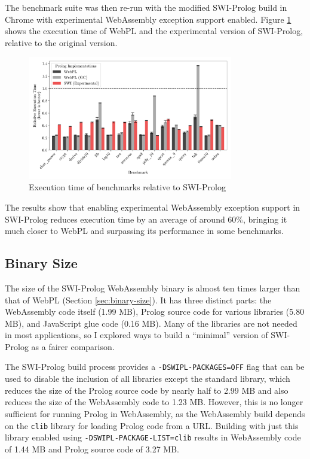 The benchmark suite was then re-run with the modified SWI-Prolog build in Chrome with experimental WebAssembly exception support enabled. Figure \ref{fig:swi-prolog-exception} shows the execution time of WebPL and the experimental version of SWI-Prolog, relative to the original version.

\begin{figure}[H]
\centering
\includegraphics[width=0.8\textwidth]{relative_performance_exnref.pdf}
\caption{Execution time of benchmarks relative to SWI-Prolog}
\label{fig:swi-prolog-exception}
\end{figure}

The results show that enabling experimental WebAssembly exception support in SWI-Prolog reduces execution time by an average of around 60\%, bringing it much closer to WebPL and surpassing its performance in some benchmarks.

\subsection{Binary Size}

\label{sec:binary-size-opt}

The size of the SWI-Prolog WebAssembly binary is almost ten times larger than that of WebPL (Section \ref{sec:binary-size}). It has three distinct parts: the WebAssembly code itself (1.99 MB), Prolog source code for various libraries (5.80 MB), and JavaScript glue code (0.16 MB). Many of the libraries are not needed in most applications, so I explored ways to build a ``minimal'' version of SWI-Prolog as a fairer comparison.

The SWI-Prolog build process provides a \texttt{-DSWIPL-PACKAGES=OFF} flag that can be used to disable the inclusion of all libraries except the standard library, which reduces the size of the Prolog source code by nearly half to 2.99 MB and also reduces the size of the WebAssembly code to 1.23 MB. However, this is no longer sufficient for running Prolog in WebAssembly, as the WebAssembly build depends on the \texttt{clib} library for loading Prolog code from a URL. Building with just this library enabled using \texttt{-DSWIPL-PACKAGE-LIST=clib} results in WebAssembly code of 1.44 MB and Prolog source code of 3.27 MB.

